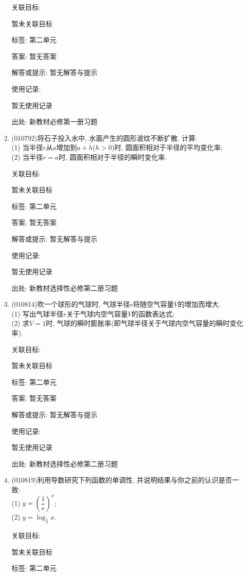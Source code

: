 \documentclass[10pt,a4paper]{article}
\begin{document}
\begin{enumerate}[1.]
关联目标:

暂未关联目标



标签: 第二单元

答案: 暂无答案

解答或提示: 暂无解答与提示

使用记录:

暂无使用记录


出处: 新教材必修第一册习题
\item { (010792)}将石子投入水中, 水面产生的圆形波纹不断扩散. 计算:\\
(1) 当半径$r$从$a$增加到$a+h$($h>0$)时, 圆面积相对于半径的平均变化率;\\
(2) 当半径$r=a$时, 圆面积相对于半径的瞬时变化率.


关联目标:

暂未关联目标



标签: 第二单元

答案: 暂无答案

解答或提示: 暂无解答与提示

使用记录:

暂无使用记录


出处: 新教材选择性必修第二册习题
\item { (010814)}吹一个球形的气球时, 气球半径$r$将随空气容量$V$的增加而增大.\\
(1) 写出气球半径$r$关于气球内空气容量$V$的函数表达式;\\
(2) 求$V=1$时, 气球的瞬时膨胀率(即气球半径关于气球内空气容量的瞬时变化率).


关联目标:

暂未关联目标



标签: 第二单元

答案: 暂无答案

解答或提示: 暂无解答与提示

使用记录:

暂无使用记录


出处: 新教材选择性必修第二册习题
\item { (010819)}利用导数研究下列函数的单调性, 并说明结果与你之前的认识是否一致:\\
(1) $y=(\dfrac 1{\mathrm{e}})^x$;\\
(2) $y=\log_{\frac 1{\mathrm{e}}}x$.


关联目标:

暂未关联目标



标签: 第二单元


\end{enumerate}
\end{document}
